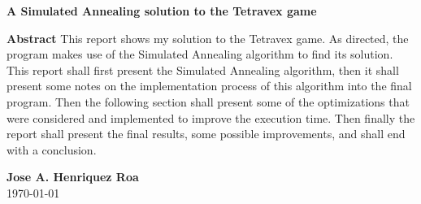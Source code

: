 \documentclass[11pt]{article}
\begin{document}
\begin{titlepage}
    \begin{center}
    \Huge \textbf{A Simulated Annealing solution to the Tetravex game}\\
    \vfill
    \end{center}
    \textbf{Abstract} This report shows my solution to the Tetravex game. As
    directed, the program makes use of the Simulated Annealing algorithm to find
    its solution. This report shall first present the Simulated Annealing
    algorithm, then it shall present some notes on the implementation process of
    this algorithm into the final program. Then the following section shall
    present some of the optimizations that were considered and implemented to
    improve the execution time. Then finally the report shall present the final
    results, some possible improvements, and shall end with a conclusion.
    \vfill
     \tableofcontents
  \begin{center}
    \vfill
    \normalsize \textbf{Jose A. Henriquez Roa}\\
    \vspace*{2\baselineskip} \today \rhead{\today}
  \end{center}
\end{titlepage}

\pagestyle{fancy}
\rhead{}
\renewcommand{\headrulewidth}{1pt}
\renewcommand{\footrulewidth}{1pt}
\end{document}
